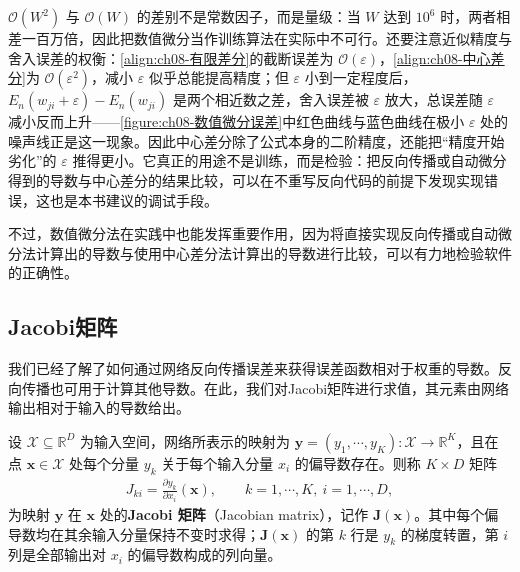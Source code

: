 \documentclass[../../main.tex]{subfiles}
\begin{document}
\begin{remark}
$\mathcal{O}(W^{2})$ 与 $\mathcal{O}(W)$ 的差别不是常数因子，而是量级：当 $W$ 达到 $10^{6}$ 时，两者相差一百万倍，因此把数值微分当作训练算法在实际中不可行。还要注意近似精度与舍入误差的权衡：\eqref{align:ch08-有限差分}的截断误差为 $\mathcal{O}(\varepsilon)$，\eqref{align:ch08-中心差分}为 $\mathcal{O}(\varepsilon^{2})$，减小 $\varepsilon$ 似乎总能提高精度；但 $\varepsilon$ 小到一定程度后，$E_n(w_{ji}+\varepsilon)-E_n(w_{ji})$ 是两个相近数之差，舍入误差被 $\varepsilon$ 放大，总误差随 $\varepsilon$ 减小反而上升——\cref{figure:ch08-数值微分误差}中红色曲线与蓝色曲线在极小 $\varepsilon$ 处的噪声线正是这一现象。因此中心差分除了公式本身的二阶精度，还能把“精度开始劣化”的 $\varepsilon$ 推得更小。它真正的用途不是训练，而是检验：把反向传播或自动微分得到的导数与中心差分的结果比较，可以在不重写反向代码的前提下发现实现错误，这也是本书建议的调试手段。
\end{remark}

不过，数值微分法在实践中也能发挥重要作用，因为将直接实现反向传播或自动微分法计算出的导数与使用中心差分法计算出的导数进行比较，可以有力地检验软件的正确性。

\subsection{Jacobi矩阵}\label{subsection:ch08-Jacobi矩阵}

我们已经了解了如何通过网络反向传播误差来获得误差函数相对于权重的导数。反向传播也可用于计算其他导数。在此，我们对Jacobi矩阵进行求值，其元素由网络输出相对于输入的导数给出。

\begin{definition}[Jacobi矩阵]\label{definition:ch08-Jacobi矩阵}
设 $\mathcal{X}\subseteq\mathbb{R}^{D}$ 为输入空间，网络所表示的映射为 $\mathbf{y}=(y_1,\cdots,y_K):\mathcal{X}\to\mathbb{R}^{K}$，且在点 $\mathbf{x}\in\mathcal{X}$ 处每个分量 $y_k$ 关于每个输入分量 $x_i$ 的偏导数存在。则称 $K\times D$ 矩阵
\begin{align}
J_{ki}=\frac{\partial y_k}{\partial x_i}(\mathbf{x}),\qquad k=1,\cdots,K,\ i=1,\cdots,D,
\label{align:ch08-Jacobi}
\end{align}
为映射 $\mathbf{y}$ 在 $\mathbf{x}$ 处的\textbf{Jacobi 矩阵}（Jacobian matrix），记作 $\mathbf{J}(\mathbf{x})$。其中每个偏导数均在其余输入分量保持不变时求得；$\mathbf{J}(\mathbf{x})$ 的第 $k$ 行是 $y_k$ 的梯度转置，第 $i$ 列是全部输出对 $x_i$ 的偏导数构成的列向量。
\end{definition}
\end{document}
